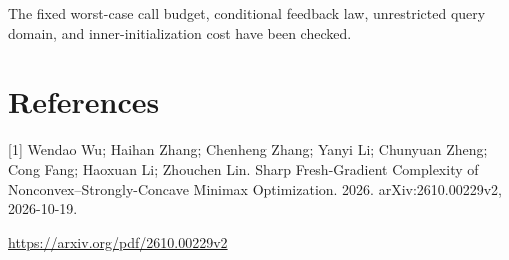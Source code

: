 \documentclass[10pt,a4paper]{article}
\begin{document}
The fixed worst-case call budget, conditional feedback law, unrestricted query domain, and inner-initialization cost have been checked.

\section{References}
[1] Wendao Wu; Haihan Zhang; Chenheng Zhang; Yanyi Li; Chunyuan Zheng; Cong Fang; Haoxuan Li; Zhouchen Lin. Sharp Fresh-Gradient Complexity of Nonconvex--Strongly-Concave Minimax Optimization. 2026. arXiv:2610.00229v2, 2026-10-19.

\url{https://arxiv.org/pdf/2610.00229v2}
\end{document}
